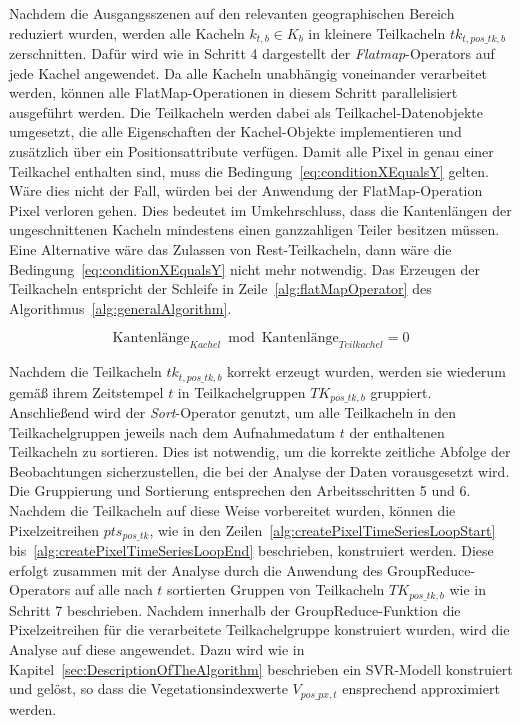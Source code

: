 Nachdem die Ausgangsszenen auf den relevanten geographischen Bereich reduziert wurden, werden alle Kacheln $k_{t, b} \in K_{b}$ in kleinere Teilkacheln $tk_{t, pos\_tk, b}$ zerschnitten. Dafür wird wie in Schritt 4 dargestellt der \textit{Flatmap}-Operators auf jede Kachel angewendet. Da alle Kacheln unabhängig voneinander verarbeitet werden, können alle FlatMap-Operationen in diesem Schritt parallelisiert ausgeführt werden. Die Teilkacheln werden dabei als Teilkachel-Datenobjekte umgesetzt, die alle Eigenschaften der Kachel-Objekte implementieren und zusätzlich über ein Positionsattribute verfügen. Damit alle Pixel in genau einer Teilkachel enthalten sind, muss die Bedingung~\ref{eq:conditionXEqualsY} gelten. Wäre dies nicht der Fall, würden bei der Anwendung der FlatMap-Operation Pixel verloren gehen. Dies bedeutet im Umkehrschluss, dass die Kantenlängen der ungeschnittenen Kacheln mindestens einen ganzzahligen Teiler besitzen müssen. Eine Alternative wäre das Zulassen von Rest-Teilkacheln, dann wäre die Bedingung~\ref{eq:conditionXEqualsY} nicht mehr notwendig. Das Erzeugen der Teilkacheln entspricht der Schleife in Zeile~\ref{alg:flatMapOperator} des Algorithmus~\ref{alg:generalAlgorithm}.

\begin{equation} \label{eq:conditionXEqualsY}
\text{Kantenlänge}_{Kachel} \bmod \text{Kantenlänge}_{Teilkachel} = 0
\end{equation}
 
Nachdem die Teilkacheln $tk_{t, pos\_tk, b}$ korrekt erzeugt wurden, werden sie wiederum gemäß ihrem Zeitstempel $t$ in Teilkachelgruppen $TK_{pos\_tk, b}$ gruppiert. Anschließend wird der \textit{Sort}-Operator genutzt, um alle Teilkacheln in den Teilkachelgruppen jeweils nach dem Aufnahmedatum $t$ der enthaltenen Teilkacheln zu sortieren. Dies ist notwendig, um die korrekte zeitliche Abfolge der Beobachtungen sicherzustellen, die bei der Analyse der Daten vorausgesetzt wird. Die Gruppierung und Sortierung entsprechen den Arbeitsschritten 5 und 6.
Nachdem die Teilkacheln auf diese Weise vorbereitet wurden, können die Pixelzeitreihen $pts_{pos\_tk}$, wie in den Zeilen~\ref{alg:createPixelTimeSeriesLoopStart} bis~\ref{alg:createPixelTimeSeriesLoopEnd} beschrieben, konstruiert werden. 
Diese erfolgt zusammen mit der Analyse durch die Anwendung des GroupReduce-Operators auf alle nach $t$ sortierten Gruppen von Teilkacheln $TK_{pos\_tk, b}$ wie in Schritt 7 beschrieben. Nachdem innerhalb der GroupReduce-Funktion die Pixelzeitreihen für die verarbeitete Teilkachelgruppe konstruiert wurden, wird die Analyse auf diese angewendet. Dazu wird wie in Kapitel~\ref{sec:DescriptionOfTheAlgorithm} beschrieben ein SVR-Modell konstruiert und gelöst, so dass die Vegetationsindexwerte $V_{pos\_px, t}$ ensprechend approximiert werden. 

